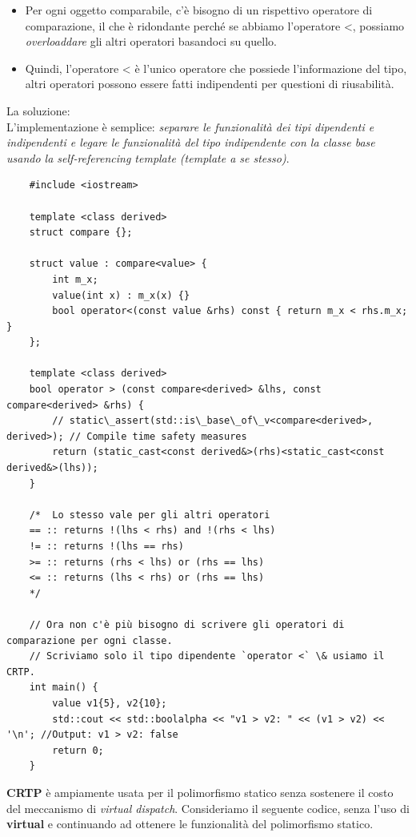 \begin{itemize}
	\item \textsf{\small Per ogni oggetto comparabile, c'è bisogno di un rispettivo operatore di comparazione, il che è ridondante perché se abbiamo l'operatore <, possiamo \emph{overloaddare} gli altri operatori basandoci su quello.}
	\item \textsf{\small Quindi, l'operatore < è l'unico operatore che possiede l'informazione del tipo, altri operatori possono essere fatti indipendenti per questioni di riusabilità.}
\end{itemize}

\textsf{\small La soluzione: } \\

\textsf{\small L'implementazione è semplice: \emph{separare le funzionalità dei tipi dipendenti e indipendenti e legare le funzionalità del tipo indipendente con la classe base usando la \emph{self-referencing template} (template a se stesso)}.} \\

\begin{lstlisting}
	#include <iostream>
	
	template <class derived>
	struct compare {};
	
	struct value : compare<value> {
		int m_x;
		value(int x) : m_x(x) {}
		bool operator<(const value &rhs) const { return m_x < rhs.m_x; }
	};
	
	template <class derived>
	bool operator > (const compare<derived> &lhs, const compare<derived> &rhs) {
		// static\_assert(std::is\_base\_of\_v<compare<derived>, derived>); // Compile time safety measures
		return (static_cast<const derived&>(rhs)<static_cast<const derived&>(lhs));
	}
	
	/*  Lo stesso vale per gli altri operatori
	== :: returns !(lhs < rhs) and !(rhs < lhs)
	!= :: returns !(lhs == rhs)
	>= :: returns (rhs < lhs) or (rhs == lhs)
	<= :: returns (lhs < rhs) or (rhs == lhs) 
	*/
	
	// Ora non c'è più bisogno di scrivere gli operatori di comparazione per ogni classe.
	// Scriviamo solo il tipo dipendente `operator <` \& usiamo il CRTP.
	int main() {   
		value v1{5}, v2{10};
		std::cout << std::boolalpha << "v1 > v2: " << (v1 > v2) << '\n'; //Output: v1 > v2: false
		return 0;
	}
\end{lstlisting}

\textsf{\small \textbf{CRTP} è ampiamente usata per il polimorfismo statico senza sostenere il costo del meccanismo di \emph{virtual dispatch}. Consideriamo il seguente codice, senza l'uso di \textbf{virtual} e continuando ad ottenere le funzionalità del polimorfismo statico.} \\

